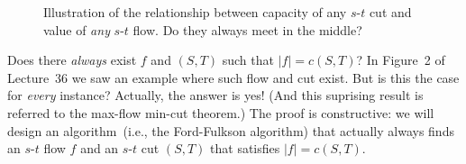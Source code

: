 \begin{figure}[h]
\centering{}
\caption{Illustration of the relationship between capacity of any $s$-$t$ cut
and value of \emph{any} $s$-$t$ flow.  Do they always meet in the middle?}
\label{fig:meet}
\end{figure}

Does there \emph{always} exist $f$ and $(S,T)$ such that $|f| = c(S,T)$?
In Figure~2 of Lecture~36 we saw an example where such flow and cut exist.
But is this the case for \emph{every} instance?
Actually, the answer is yes! (And this suprising result is referred to the max-flow min-cut theorem.)
The proof is constructive: we will design an algorithm~(i.e., the Ford-Fulkson algorithm)
that actually always finds an $s$-$t$ flow $f$ and an $s$-$t$ cut $(S, T)$
that satisfies $|f| = c(S, T)$.


